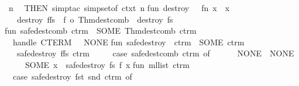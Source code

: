 \begin{isabellebody}
\endisaantiq
\ n\isanewline
\ \ THEN\ simp{}tac\ {}simpset{}of\ ctxt{}\ n\isanewline
\isanewline
fun\ destroy\ {}{}\ {}\ {}fn\ x\ {}{}\ x{}\isanewline
\ \ {}\ destroy\ {}f{}{}fs{}\ {}\ f\ o\ Thm{}dest{}comb\ {}{}\ destroy\ fs\isanewline
\isanewline
fun\ safe{}dest{}comb\ ctrm\ {}\ SOME\ {}Thm{}dest{}comb\ ctrm{}\isanewline
\ \ handle\ CTERM\ {}\ {}{}\ NONE\isanewline
\isanewline
fun\ safe{}destroy\ {}{}\ ctrm\ {}\ SOME\ ctrm\isanewline
\ \ {}\ safe{}destroy\ {}f{}{}fs{}\ ctrm\ {}\isanewline
\ \ \ \ case\ {}safe{}dest{}comb\ ctrm{}\ of\isanewline
\ \ \ \ \ \ NONE\ {}{}\ NONE\isanewline
\ \ \ \ {}\ SOME\ x\ {}{}\ safe{}destroy\ fs\ {}f\ x{}{}\isanewline
\isanewline
fun\ ml{}list\ ctrm\ {}\isanewline
\ \ case\ {}safe{}destroy\ {}fst{}\ snd{}\ ctrm{}\ of\isanewline

\end{isabellebody}
